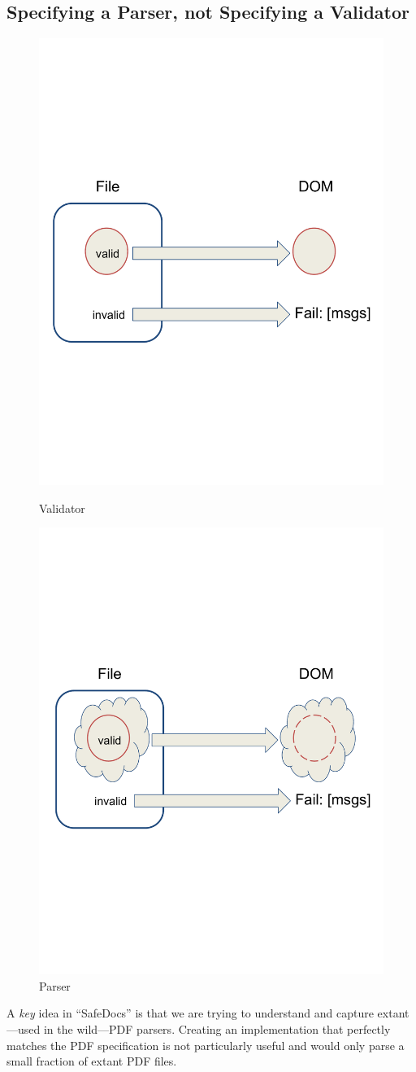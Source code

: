 
\subsection{Specifying a Parser, not Specifying a Validator}
\label{sec:spec-approach}

\begin{figure}[t]
    \centering
    \includegraphics[width=0.50\linewidth]{figures/validator.pdf}
    \caption{Validator}
    \label{fig:validator}
    
    \includegraphics[width=0.50\linewidth]{figures/parser.pdf}
    \caption{Parser}
    \label{fig:parser}
\end{figure}

A \emph{key} idea in ``SafeDocs'' is that we are trying to understand and
capture extant---used in the wild---PDF parsers.  Creating an implementation
that perfectly matches the PDF specification is not particularly useful
and would only parse a small fraction of extant PDF files.


